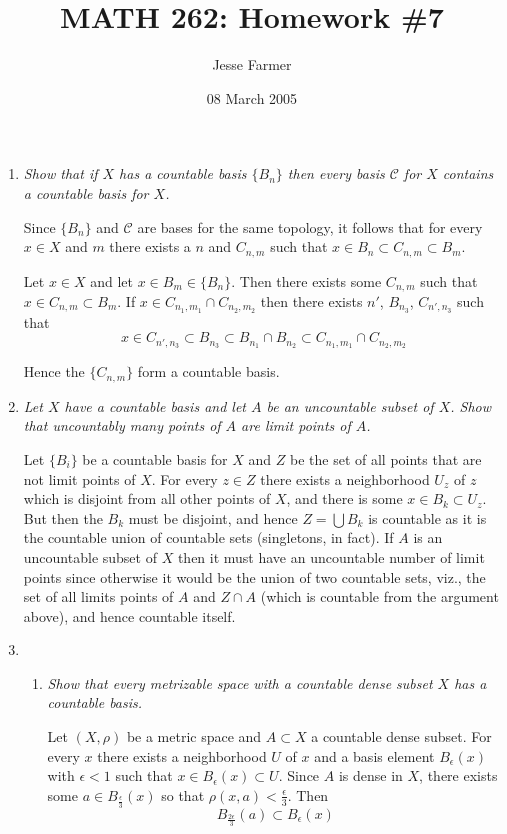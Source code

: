 \documentclass[10pt]{article}
\title{MATH 262: Homework \#7}
\author{Jesse Farmer}
\date{08 March 2005}
\begin{document}
\maketitle
\begin{enumerate}

\item \emph{Show that if $X$ has a countable basis $\{B_n\}$ then every basis $\mathcal{C}$ for $X$ contains a countable basis for $X$.}

Since $\{B_n\}$ and $\mathcal{C}$ are bases for the same topology, it follows that for every $x \in X$ and $m$ there exists a $n$ and $C_{n,m}$ such that $x \in B_n \subset C_{n,m} \subset B_m$.

Let $x \in X$ and let $x \in B_m \in \{B_n\}$.  Then there exists some $C_{n,m}$ such that $x \in C_{n,m} \subset B_m$.  If $x \in C_{n_1, m_1} \cap C_{n_2, m_2}$ then there exists $n'$, $B_{n_3}$, $C_{n', n_3}$ such that 
\[
x \in C_{n', n_3} \subset B_{n_3} \subset B_{n_1} \cap B_{n_2} \subset C_{n_1, m_1} \cap C_{n_2, m_2}
\]

Hence the $\{C_{n,m}\}$ form a countable basis.

\item \emph{Let $X$ have a countable basis and let $A$ be an uncountable subset of $X$.  Show that uncountably many points of $A$ are limit points of $A$.}

Let $\{B_i\}$ be a countable basis for $X$ and $Z$ be the set of all points that are not limit points of $X$.  For every $z \in Z$ there exists a neighborhood $U_z$ of $z$ which is disjoint from all other points of $X$, and there is some $x \in B_k \subset U_z$.  But then the $B_k$ must be disjoint, and hence $Z = \bigcup B_k$ is countable as it is the countable union of countable sets (singletons, in fact).  If $A$ is an uncountable subset of $X$ then it must have an uncountable number of limit points since otherwise it would be the union of two countable sets, viz., the set of all limits points of $A$ and $Z \cap A$ (which is countable from the argument above), and hence countable itself.

\item
\begin{enumerate}
\item \emph{Show that every metrizable space with a countable dense subset $X$ has a countable basis.}

Let $(X, \rho)$ be a metric space and $A \subset X$ a countable dense subset.  For every $x$ there exists a neighborhood $U$ of $x$ and a basis element $B_\epsilon(x)$ with $\epsilon < 1$ such that $x \in B_\epsilon(x) \subset U$.  Since $A$ is dense in $X$, there exists some $a \in B_\frac{\epsilon}{3}(x)$ so that $\rho(x,a) < \frac{\epsilon}{3}$.  Then $$B_\frac{2\epsilon}{3}(a) \subset B_\epsilon(x)$$


\end{enumerate}
\end{enumerate}
\end{document}
